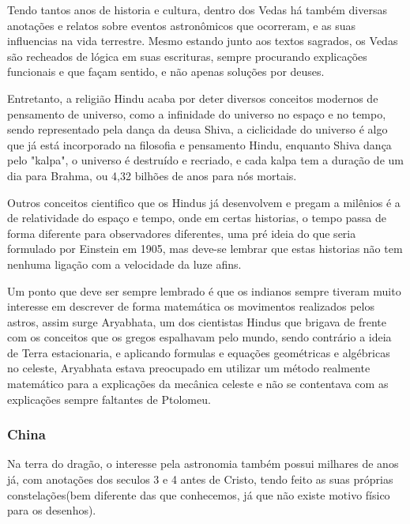 Tendo tantos anos de historia e cultura, dentro dos Vedas há também diversas anotações e relatos sobre eventos astronômicos que ocorreram, e as suas influencias na vida terrestre. Mesmo estando junto aos textos sagrados, os Vedas são recheados de lógica em suas escrituras, sempre procurando explicações funcionais e que façam sentido, e não apenas soluções por deuses. 

Entretanto, a religião Hindu acaba por deter diversos conceitos modernos de pensamento de universo, como a infinidade do universo no espaço e no tempo, sendo representado pela dança da deusa Shiva, a ciclicidade do universo é algo que já está incorporado na filosofia e pensamento Hindu, enquanto Shiva dança pelo "kalpa", o universo é destruído e recriado, e cada kalpa tem a duração de um dia para Brahma, ou 4,32 bilhões de anos para nós mortais.


Outros conceitos cientifico que os Hindus já desenvolvem e pregam a milênios é a de relatividade do espaço e tempo, onde em certas historias, o tempo passa de forma diferente para observadores diferentes, uma pré ideia do que seria formulado por Einstein em 1905, mas deve-se lembrar que estas historias não tem nenhuma ligação com a velocidade da luze afins.


Um ponto que deve ser sempre lembrado é que os indianos sempre tiveram muito interesse em descrever de forma matemática os movimentos realizados pelos astros, assim surge Aryabhata, um dos cientistas Hindus que brigava de frente com os conceitos que os gregos espalhavam pelo mundo, sendo contrário a ideia de Terra estacionaria, e aplicando formulas e equações geométricas e algébricas no celeste, Aryabhata estava preocupado em utilizar um método realmente matemático para a explicações da mecânica celeste e não se contentava com as explicações sempre faltantes de Ptolomeu.

\begin{figure}[!h]
	\center
	\qquad
\end{figure}



\subsubsection*{China}
Na terra do dragão, o interesse pela astronomia também possui milhares de anos já, com anotações dos seculos 3 e 4 antes de Cristo, tendo feito as suas próprias constelações(bem diferente das que conhecemos, já que não existe motivo físico para os desenhos).

